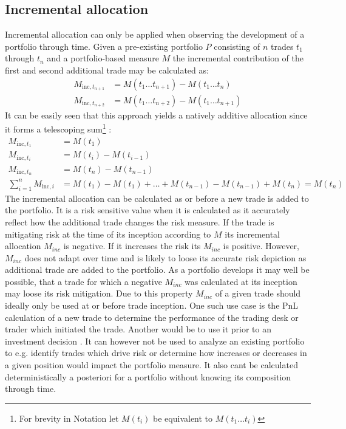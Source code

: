 \documentclass[../Thesis_AHoecherl.tex]{subfiles}
\begin{document}
\subsection{Incremental allocation}
Incremental allocation can only be applied when observing the development of a portfolio through time. Given a pre-existing portfolio $P$ consisting of $n$ trades $t_1$ through $t_n$ and a portfolio-based measure $M$ the incremental contribution of the first and second additional trade may be calculated as:
\begin{align*}
M_{\text{inc},t_{n+1}} & =M\left(t_1\dots t_{n+1}\right)- M\left(t_1\dots t_{n}\right) \\
M_{\text{inc},t_{n+2}} & =M\left(t_1\dots t_{n+2}\right)- M\left(t_1\dots t_{n+1}\right)
\end{align*}
It can be easily seen that this approach yields a natively additive allocation since it forms a telescoping sum\footnote{For brevity in Notation let $M(t_i)$ be equivalent to $M(t_1\dots t_i)$ 
} :
\begin{align*}
M_{\text{inc},t_1}&=M(t_1) \\
M_{\text{inc},t_i}&= M(t_i)-M(t_{i-1}) \\
M_{\text{inc},t_n}&= M(t_n) - M(t_{n-1})\\
\sum_{i=1}^{n}{M_{\text{inc},i}} &= M(t_1)-M(t_1)+\dots+M(t_{n-1})-M(t_{n-1})+M(t_n) = M(t_n)
\end{align*}
The incremental allocation can be calculated as or before a new trade is added to the portfolio. It is a risk sensitive value when it is calculated as it accurately reflect how the additional trade changes the risk measure. If the trade is mitigating risk at the time of its inception according to $M$ its incremental allocation $M_{inc}$ is negative. If it increases the risk its $M_{inc}$ is positive. However, $M_{inc}$ does not adapt over time and is likely to loose its accurate risk depiction as additional trade are added to the portfolio. As a portfolio develops it may well be possible, that a trade for which a negative $M_{inc}$ was calculated at its inception may loose its risk mitigation. Due to this property $M_{inc}$ of a given trade should ideally only be used at or before trade inception. One such use case is the PnL calculation of a new trade to determine the performance of the trading desk or trader which initiated the trade. Another would be to use it prior to an investment decision \cite{tibiletti2001incremental}. It can however not be used to analyze an existing portfolio to e.g. identify trades which drive risk or determine how increases or decreases in a given position would impact the portfolio measure. It also cant be calculated deterministically a posteriori for a portfolio without knowing its composition through time.
\end{document}

